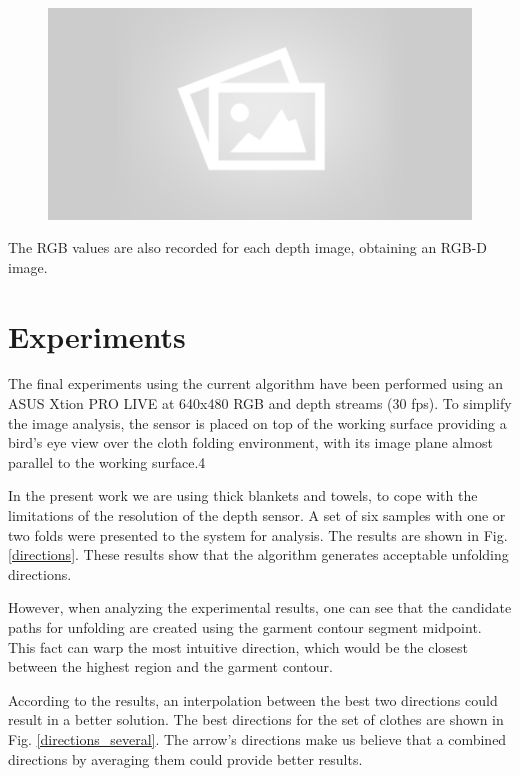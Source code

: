\begin{figure}[thpb]
    \centering
    \includegraphics[width=0.7
    \textwidth]{figures/placeholder2.png}
    \caption{}
    \label{fig:point_cloud_and_depth_image}
\end{figure}

The RGB values are also recorded for each depth image, obtaining an RGB-D image.

\section{Experiments }
\label{experiments:experiments}

The final experiments using the current algorithm have been performed using an ASUS Xtion PRO LIVE at 640x480 RGB and depth streams (30 fps).
To simplify the image analysis, the sensor is placed on top of the working surface  providing a bird's eye view over the cloth folding environment, with its image plane almost parallel to the working surface.4

In the present work we are using thick blankets and towels, to cope with the limitations of the resolution of the depth sensor. A set of six samples with one or two folds were presented to the system for analysis. The results are shown in Fig. \ref{directions}.
%
These results show that the algorithm generates acceptable unfolding directions.

However, when analyzing the experimental results, one can see that the candidate paths for unfolding are created using the garment contour segment midpoint. This fact can warp the most intuitive direction, which would be the closest between the highest region and the garment contour.

According to the results, an interpolation between the best two directions could result in a better solution. The best directions for the set of clothes are shown in Fig. \ref{directions_several}. The arrow's directions make us believe that a combined directions by averaging them could provide better results.

